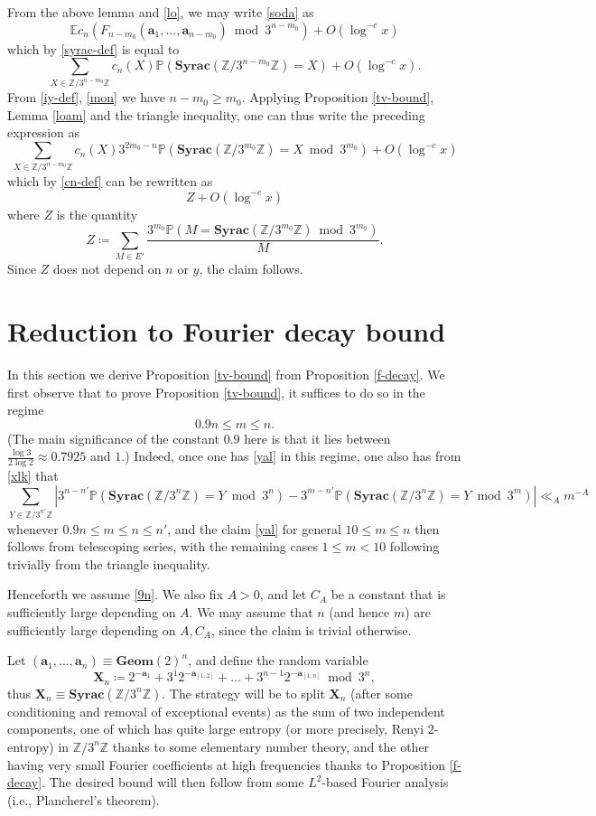 \documentclass[12pt,a4paper,reqno]{amsart}
\numberwithin{equation}{section}
\theoremstyle{plain}
\theoremstyle{definition}
\renewcommand\P{\mathbb{P}}
\newcommand\E{\mathbb{E}}
\newcommand\Z{\mathbb{Z}}
\renewcommand\a{\mathbf{a}}
\newcommand\X{\mathbf{X}}
\newcommand\Geom{\mathbf{Geom}}
\newcommand\Syrac{\mathbf{Syrac}}
\renewcommand{\mod}{\bmod}
\begin{document}
From the above lemma and \eqref{lo}, we may write \eqref{soda} as
$$  \E c_n( F_{n-m_0}(\a_1,\dots,\a_{n-m_0}) \mod 3^{n-m_0} ) +  O( \log^{-c} x  )$$
which by \eqref{syrac-def} is equal to
$$ \sum_{X \in \Z/3^{n-m_0}\Z} c_n(X) \P( \Syrac(\Z/3^{n-m_0}\Z) = X ) +  O( \log^{-c} x  ).$$
From \eqref{iy-def}, \eqref{mon} we have $n-m_0 \geq m_0$.  
Applying Proposition \ref{tv-bound}, Lemma \ref{loam} and the triangle inequality, one can thus write the preceding expression as
$$ \sum_{X \in \Z/3^{n-m_0}\Z} c_n(X) 3^{2m_0-n} \P( \Syrac(\Z/3^{m_0}\Z) = X \mod 3^{m_0}) +  O( \log^{-c} x  )$$
which by \eqref{cn-def} can be rewritten as	
$$ Z +  O( \log^{-c} x  )$$
where $Z$ is the quantity
$$ Z \coloneqq \sum_{M \in E'} \frac{3^{m_0} \P( M = \Syrac(\Z/3^{m_0}\Z) \mod 3^{m_0})}{M}.$$
Since $Z$ does not depend on $n$ or $y$, the claim follows.

\section{Reduction to Fourier decay bound}\label{decay-sec}

In this section we derive Proposition \ref{tv-bound} from Proposition \ref{f-decay}.  We first observe that to prove Proposition \ref{tv-bound}, it suffices to do so in the regime
\begin{equation}\label{9n}
 0.9 n \leq m \leq n.
\end{equation}
(The main significance of the constant $0.9$ here is that it lies between $\frac{\log 3}{2\log 2} \approx 0.7925$ and $1$.)  Indeed, once one has \eqref{yal} in this regime, one also has from \eqref{xlk} that
$$\sum_{Y \in \Z/3^{n'}\Z} \left|3^{n-n'} \P( \Syrac(\Z/3^n\Z) = Y \mod 3^n ) - 
3^{m-n'} \P( \Syrac(\Z/3^n\Z) = Y \mod 3^m ) \right| \ll_A m^{-A}
$$
whenever $0.9 n \leq m \leq n \leq n'$, and the claim \eqref{yal} for general $10 \leq m \leq n$ then follows from telescoping series, with the remaining cases $1 \leq m < 10$ following trivially from the triangle inequality.

Henceforth we assume \eqref{9n}.  We also fix $A>0$, and let $C_A$ be a constant that is sufficiently large depending on $A$.
We may assume that $n$ (and hence $m$) are sufficiently large depending on $A,C_A$, since the claim is trivial otherwise.

Let $(\a_1,\dots,\a_n) \equiv \Geom(2)^n$, and define the random variable
$$ \X_n \coloneqq 2^{-\a_1} + 3^1 2^{-\a_{[1,2]}} + \dots + 3^{n-1} 2^{-\a_{[1,n]}} \mod 3^n,$$
thus $\X_n \equiv \Syrac(\Z/3^n\Z)$.  The strategy will be to split $\X_n$ (after some conditioning and removal of exceptional events) as the sum of two independent components, one of which has quite large entropy (or more precisely, Renyi $2$-entropy) in $\Z/3^n\Z$ thanks to some elementary number theory, and the other having very small Fourier coefficients at high frequencies thanks to Proposition \ref{f-decay}.  The desired bound will then follow from some $L^2$-based Fourier analysis (i.e.,  Plancherel's theorem).
\end{document}
